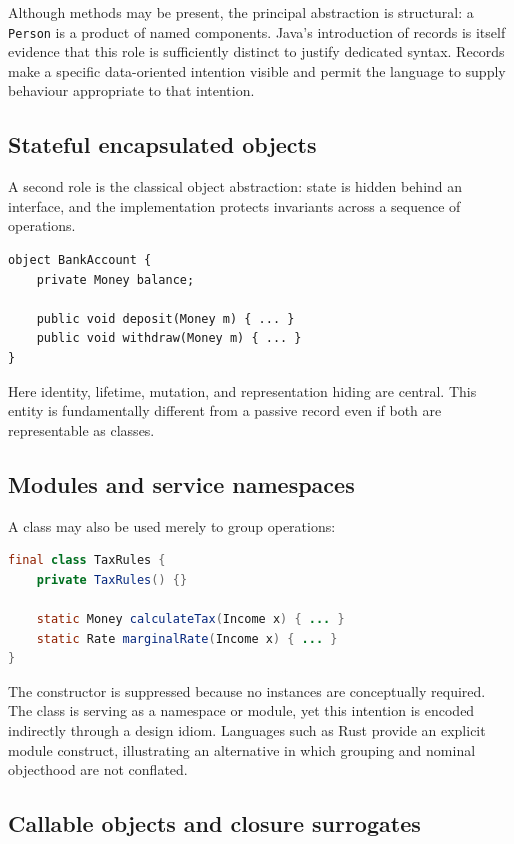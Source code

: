 \documentclass[11pt]{article}
\begin{document}
Although methods may be present, the principal abstraction is structural: a \texttt{Person} is a product of named components. Java's introduction of records is itself evidence that this role is sufficiently distinct to justify dedicated syntax. Records make a specific data-oriented intention visible and permit the language to supply behaviour appropriate to that intention.

\subsection{Stateful encapsulated objects}

A second role is the classical object abstraction: state is hidden behind an interface, and the implementation protects invariants across a sequence of operations.

\begin{lstlisting}
object BankAccount {
    private Money balance;

    public void deposit(Money m) { ... }
    public void withdraw(Money m) { ... }
}
\end{lstlisting}

Here identity, lifetime, mutation, and representation hiding are central. This entity is fundamentally different from a passive record even if both are representable as classes.

\subsection{Modules and service namespaces}

A class may also be used merely to group operations:

\begin{lstlisting}[language=Java]
final class TaxRules {
    private TaxRules() {}

    static Money calculateTax(Income x) { ... }
    static Rate marginalRate(Income x) { ... }
}
\end{lstlisting}

The constructor is suppressed because no instances are conceptually required. The class is serving as a namespace or module, yet this intention is encoded indirectly through a design idiom. Languages such as Rust provide an explicit module construct, illustrating an alternative in which grouping and nominal objecthood are not conflated.

\subsection{Callable objects and closure surrogates}
\end{document}
